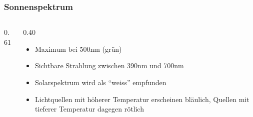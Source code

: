 \begin{frame}
\frametitle{Sonnenspektrum}
\begin{columns}
\begin{column}{0.61\hsize}
\vspace{-15pt}
\begin{center}
\end{center}
\end{column}
\begin{column}{0.40\hsize}
\begin{itemize}[<+->]
\item Maximum bei 500nm (grün)
\item Sichtbare Strahlung zwischen 390nm und 700nm
\item Solarspektrum wird als ``weiss'' empfunden
\item Lichtquellen mit höherer Temperatur erscheinen bläulich,
Quellen mit tieferer Temperatur dagegen rötlich
\end{itemize}
\end{column}
\end{columns}
\end{frame}

